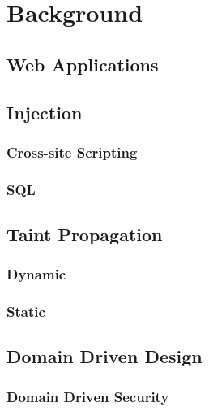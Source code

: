 \chapter{Background}


\section{Web Applications}

\section{Injection}
\subsection{Cross-site Scripting}
\subsection{SQL}

\section{Taint Propagation}
\subsection{Dynamic}
\subsection{Static}

\section{Domain Driven Design}
\subsection{Domain Driven Security}